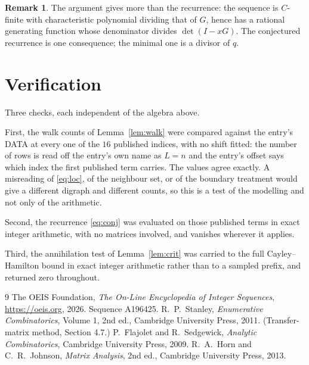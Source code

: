 \documentclass[11pt,a4paper]{article}
\theoremstyle{plain}
\theoremstyle{definition}
\newtheorem{remark}[theorem]{Remark}
\begin{document}
\begin{remark}
The argument gives more than the recurrence: the sequence is $C$-finite with characteristic
polynomial dividing that of $G$, hence has a rational generating function whose denominator
divides $\det(I-xG)$. The conjectured recurrence is one consequence; the minimal one is a
divisor of $q$.
\end{remark}

\section{Verification}

Three checks, each independent of the algebra above.

First, the walk counts of Lemma~\ref{lem:walk} were compared against the entry's DATA at
every one of the $16$ published indices, with no shift fitted: the number of rows is
read off the entry's own name as $L=n$ and the entry's offset says which index the first
published term carries. The values agree exactly. A misreading of \eqref{eq:loc}, of the
neighbour set, or of the boundary treatment would give a different digraph and different
counts, so this is a test of the modelling and not only of the arithmetic.

Second, the recurrence \eqref{eq:conj} was evaluated on those published terms in exact
integer arithmetic, with no matrices involved, and vanishes wherever it applies.

Third, the annihilation test of Lemma~\ref{lem:crit} was carried to the full
Cayley--Hamilton bound in exact integer arithmetic rather than to a sampled prefix, and
returned zero throughout.

\begin{thebibliography}{9}
 The OEIS Foundation, \emph{The On-Line Encyclopedia of Integer
Sequences}, \url{https://oeis.org}, 2026. Sequence A196425.
 R.~P.~Stanley, \emph{Enumerative Combinatorics}, Volume 1, 2nd ed.,
Cambridge University Press, 2011. (Transfer-matrix method, Section 4.7.)
 P.~Flajolet and R.~Sedgewick, \emph{Analytic Combinatorics}, Cambridge
University Press, 2009.
 R.~A.~Horn and C.~R.~Johnson, \emph{Matrix Analysis}, 2nd ed., Cambridge
University Press, 2013.
\end{thebibliography}
\end{document}
